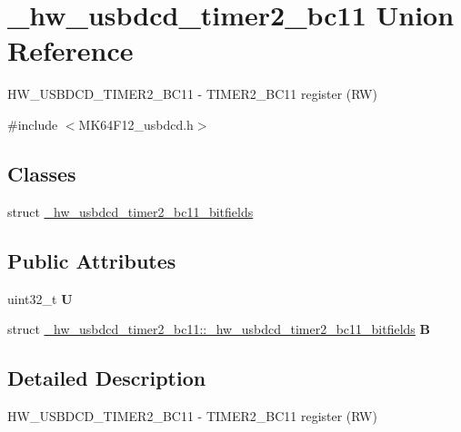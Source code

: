 \hypertarget{union__hw__usbdcd__timer2__bc11}{}\section{\+\_\+hw\+\_\+usbdcd\+\_\+timer2\+\_\+bc11 Union Reference}
\label{union__hw__usbdcd__timer2__bc11}


H\+W\+\_\+\+U\+S\+B\+D\+C\+D\+\_\+\+T\+I\+M\+E\+R2\+\_\+\+B\+C11 -\/ T\+I\+M\+E\+R2\+\_\+\+B\+C11 register (RW)  




{\ttfamily \#include $<$M\+K64\+F12\+\_\+usbdcd.\+h$>$}

\subsection*{Classes}
\begin{DoxyCompactItemize}
\item 
struct \hyperlink{struct__hw__usbdcd__timer2__bc11_1_1__hw__usbdcd__timer2__bc11__bitfields}{\+\_\+hw\+\_\+usbdcd\+\_\+timer2\+\_\+bc11\+\_\+bitfields}
\end{DoxyCompactItemize}
\subsection*{Public Attributes}
\begin{DoxyCompactItemize}
\item 
uint32\+\_\+t {\bfseries U}\hypertarget{union__hw__usbdcd__timer2__bc11_a015a09970fbf6913b22f22eb5860f489}{}\label{union__hw__usbdcd__timer2__bc11_a015a09970fbf6913b22f22eb5860f489}

\item 
struct \hyperlink{struct__hw__usbdcd__timer2__bc11_1_1__hw__usbdcd__timer2__bc11__bitfields}{\+\_\+hw\+\_\+usbdcd\+\_\+timer2\+\_\+bc11\+::\+\_\+hw\+\_\+usbdcd\+\_\+timer2\+\_\+bc11\+\_\+bitfields} {\bfseries B}\hypertarget{union__hw__usbdcd__timer2__bc11_a29f9cdabc20dafc5664be4bc899d1892}{}\label{union__hw__usbdcd__timer2__bc11_a29f9cdabc20dafc5664be4bc899d1892}

\end{DoxyCompactItemize}


\subsection{Detailed Description}
H\+W\+\_\+\+U\+S\+B\+D\+C\+D\+\_\+\+T\+I\+M\+E\+R2\+\_\+\+B\+C11 -\/ T\+I\+M\+E\+R2\+\_\+\+B\+C11 register (RW) 

